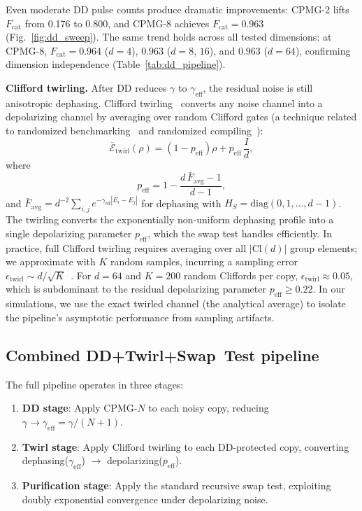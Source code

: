 \documentclass[prx,twocolumn,superscriptaddress,longbibliography,floatfix]{revtex4-2}
\begin{document}
Even moderate DD pulse counts produce dramatic improvements: CPMG-2 lifts $F_\mathrm{cat}$ from 0.176 to 0.800, and CPMG-8 achieves $F_\mathrm{cat} = 0.963$ (Fig.~\ref{fig:dd_sweep}).
The same trend holds across all tested dimensions: at CPMG-8, $F_\mathrm{cat} = 0.964$ ($d = 4$), $0.963$ ($d = 8$, $16$), and $0.963$ ($d = 64$), confirming dimension independence (Table~\ref{tab:dd_pipeline}).

\textbf{Clifford twirling.}
After DD reduces $\gamma$ to $\gamma_\mathrm{eff}$, the residual noise is still anisotropic dephasing.
Clifford twirling~\cite{Dankert2009,Wallman2016} converts any noise channel into a depolarizing channel by averaging over random Clifford gates (a technique related to randomized benchmarking~\cite{Dankert2009} and randomized compiling~\cite{Wallman2016}):
\begin{equation}
\overline{\mathcal{E}}_\mathrm{twirl}(\rho) = (1 - p_\mathrm{eff})\rho + p_\mathrm{eff}\, \frac{I}{d},
\label{eq:twirl}
\end{equation}
where
\begin{equation}
p_\mathrm{eff} = 1 - \frac{d\, \bar{F}_\mathrm{avg} - 1}{d - 1},
\label{eq:p_eff}
\end{equation}
and $\bar{F}_\mathrm{avg} = d^{-2}\sum_{i,j} e^{-\gamma_\mathrm{eff}|E_i - E_j|}$ for dephasing with $H_S = \mathrm{diag}(0, 1, \ldots, d-1)$.
The twirling converts the exponentially non-uniform dephasing profile into a single depolarizing parameter $p_\mathrm{eff}$, which the swap test handles efficiently.
In practice, full Clifford twirling requires averaging over all $|\mathrm{Cl}(d)|$ group elements; we approximate with $K$ random samples, incurring a sampling error $\epsilon_\mathrm{twirl} \sim d/\sqrt{K}$~\cite{Wallman2016}.
For $d = 64$ and $K = 200$ random Cliffords per copy, $\epsilon_\mathrm{twirl} \approx 0.05$, which is subdominant to the residual depolarizing parameter $p_\mathrm{eff} \geq 0.22$.
In our simulations, we use the exact twirled channel (the analytical average) to isolate the pipeline's asymptotic performance from sampling artifacts.


\subsection{Combined DD+Twirl+Swap~Test pipeline}
\label{sec:pipeline}

The full pipeline operates in three stages:
\begin{enumerate}
\item \textbf{DD stage}: Apply CPMG-$N$ to each noisy copy, reducing $\gamma \to \gamma_\mathrm{eff} = \gamma/(N+1)$.
\item \textbf{Twirl stage}: Apply Clifford twirling to each DD-protected copy, converting dephasing($\gamma_\mathrm{eff}$) $\to$ depolarizing($p_\mathrm{eff}$).
\item \textbf{Purification stage}: Apply the standard recursive swap test, exploiting doubly exponential convergence under depolarizing noise.
\end{enumerate}
\end{document}
